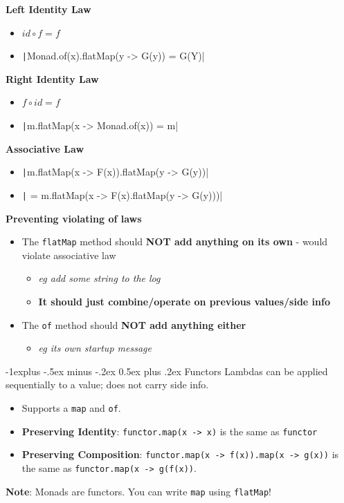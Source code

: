 \documentclass[10pt, landscape]{article}
\makeatletter
\renewcommand{\subsection}{\@startsection{subsection}{2}{0mm}%
                                {-1explus -.5ex minus -.2ex}%
                                {0.5ex plus .2ex}%
                                {\normalfont\normalsize\bfseries}}
\newcommand{\code}[1]{\textcolor{mygreen}{\texttt{#1}}}
\newcommand{\java}[1]{\texttt|#1|}
\makeatother
\begin{document}
\begin{multicols}{2}
\textbf{Left Identity Law}
\begin{itemize}
    \item $id \circ f=f$
    \item \java{Monad.of(x).flatMap(y -> G(y)) = G(Y)}
\end{itemize}
\textbf{Right Identity Law}
\begin{itemize}
    \item $f \circ id = f$
    \item \java{m.flatMap(x -> Monad.of(x)) = m}
\end{itemize}
\textbf{Associative Law}
\begin{itemize}
    \item \java{m.flatMap(x -> F(x)).flatMap(y -> G(y))} 
    \item \java{ = m.flatMap(x -> F(x).flatMap(y -> G(y)))}
\end{itemize}
\vspace{3 pt}
\textbf{Preventing violating of laws}
\begin{itemize}
    \item The \code{flatMap} method should \textbf{NOT add anything on its own} - would violate associative law
    \begin{itemize}
        \item \textit{eg add some string to the log}
        \item \textbf{It should just combine/operate on previous values/side info}
    \end{itemize}
    \item The \code{of} method should \textbf{NOT add anything either}
    \begin{itemize}
        \item \textit{eg its own startup message}
    \end{itemize}
\end{itemize}


\subsection{Functors}
Lambdas can be applied sequentially to a value; does not carry side info. 
\begin{itemize}
    \item Supports a \code{map} and \code{of}.
    \item \textbf{Preserving Identity}: \code{functor.map(x -> x)} is the same as \code{functor}
    \item \textbf{Preserving Composition}: \code{functor.map(x -> f(x)).map(x -> g(x))} is the same as \code{functor.map(x -> g(f(x))}.
\end{itemize}
\textbf{Note}: Monads are functors. You can write \code{map} using \code{flatMap}!



\end{multicols}
\end{document}
